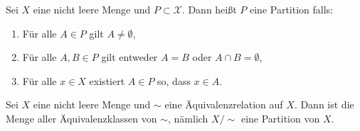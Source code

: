 \begin{definition}
Sei $X$ eine nicht leere Menge und $P \subset \mathcal{X}$. Dann heißt $P$ eine Partition falls:
\begin{enumerate}
    \item Für alle $A \in P$ gilt $A \neq \emptyset$,
    \item Für alle $A,B \in P$ gilt entweder $A=B$ oder $A \cap B = \emptyset$,
    \item Für alle $x \in X$ existiert $A \in P$ so, dass $x \in A$.
\end{enumerate}
\end{definition}
\begin{corollary}
Sei $X$ eine nicht leere Menge und $\sim$ eine Äquivalenzrelation auf $X$. Dann ist die Menge aller Äquivalenzklassen von $\sim$, nämlich $X/\sim$ eine Partition von $X$. 
\end{corollary}

